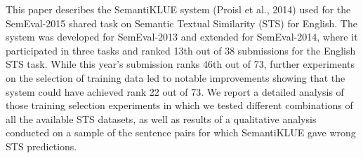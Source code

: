 This paper describes the SemantiKLUE system (Proisl et al., 2014) used for the SemEval-2015 shared task on Semantic Textual Similarity (STS) for English. The system was developed for SemEval-2013 and extended for SemEval-2014, where it participated in three tasks and ranked 13th out of 38 submissions for the English STS task. While this year's submission ranks 46th out of 73, further experiments on the selection of training data led to notable improvements showing that the system could have achieved rank 22 out of 73. We report a detailed analysis of those training selection experiments in which we tested different combinations of all the available STS datasets, as well as results of a qualitative analysis conducted on a sample of the sentence pairs for which SemantiKLUE gave wrong STS predictions.
